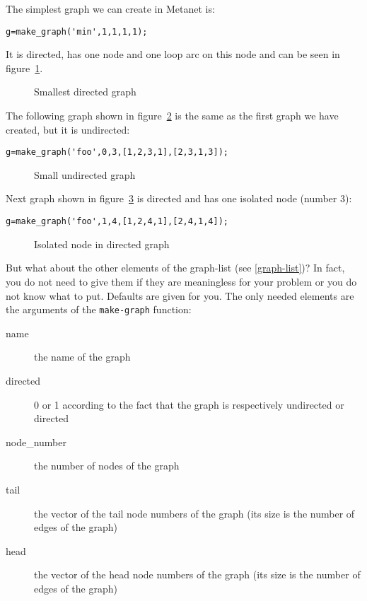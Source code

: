 \documentclass[11pt]{report}
\newcommand{\T}[1]{{\tt #1}}
\begin{document}
The simplest graph we can create in Metanet is:
\begin{verbatim}
g=make_graph('min',1,1,1,1);
\end{verbatim}

It is directed, has one node and one loop arc on this node and can be
seen in figure~\ref{fig-smallest}.
\begin{figure}
  \centerline{}
  \caption{Smallest directed graph}
  \label{fig-smallest}
\end{figure}

The following graph shown in figure~\ref{fig-usmall} is the same as
the first graph we have created, but it 
is undirected:
\begin{verbatim}
g=make_graph('foo',0,3,[1,2,3,1],[2,3,1,3]);
\end{verbatim}

\begin{figure}
  \centerline{}
  \caption{Small undirected graph}
  \label{fig-usmall}
\end{figure}

Next graph shown in figure~\ref{fig-isolated} is directed and has one
isolated node (number 3): 
\begin{verbatim}
g=make_graph('foo',1,4,[1,2,4,1],[2,4,1,4]);
\end{verbatim}

\begin{figure}
  \centerline{}
  \caption{Isolated node in directed graph}
  \label{fig-isolated}
\end{figure}

But what about the other elements of the graph-list (see \ref{graph-list})? 
In fact, you do not need to give them if they
are meaningless for your problem or you do not know what to put. Defaults
are given for you. The only needed elements are the arguments of the
\T{make-graph} function:
\begin{description}
  \item[name] the name of the graph
  \item[directed] 0 or 1 according to the fact that the graph is
    respectively undirected or directed
  \item[node\_number] the number of nodes of the graph
  \item[tail] the vector of the  tail node numbers of the graph (its
    size is the number of edges of the graph)
  \item[head] the vector of the head node numbers of the graph (its 
    size is the number of edges of the graph)
\end{description}
\end{document}
